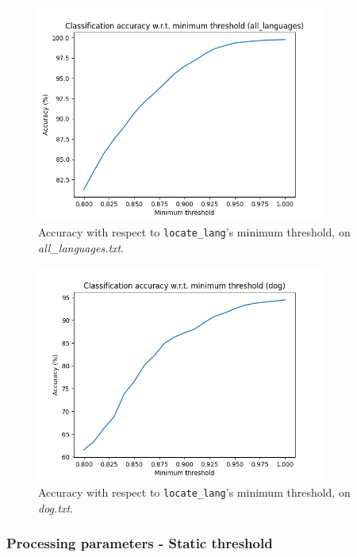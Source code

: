 \documentclass{article}
\begin{document}
\begin{figure}
    \centering
    \includegraphics[width=0.85\textwidth]{../results/all_languages/ll-m.png}
    \caption{Accuracy with respect to \texttt{locate\_lang}'s minimum threshold, on \textit{all\_languages.txt}.}
    \label{fig:ll_m_all_languages}
\end{figure}

\begin{figure}
    \centering
    \includegraphics[width=0.85\textwidth]{../results/dog/ll-m.png}
    \caption{Accuracy with respect to \texttt{locate\_lang}'s minimum threshold, on \textit{dog.txt}.}
    \label{fig:ll_m_dog}
\end{figure}

\subsubsection{Processing parameters - Static threshold}
\label{subsubsec:results_locate_lang_static_threshold_processing}
\end{document}
